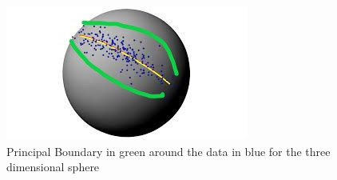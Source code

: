 \documentclass[12pt]{report}
\begin{document}
\begin{figure}[ht]
    \begin{center}
        \includegraphics[scale=1.2]{boundary_on_sphere.png}
        \caption{Principal Boundary in green around the data in blue
        for the three dimensional sphere}
        \label{fig:Principal Boundary}
    \end{center}
\end{figure}
\end{document}
